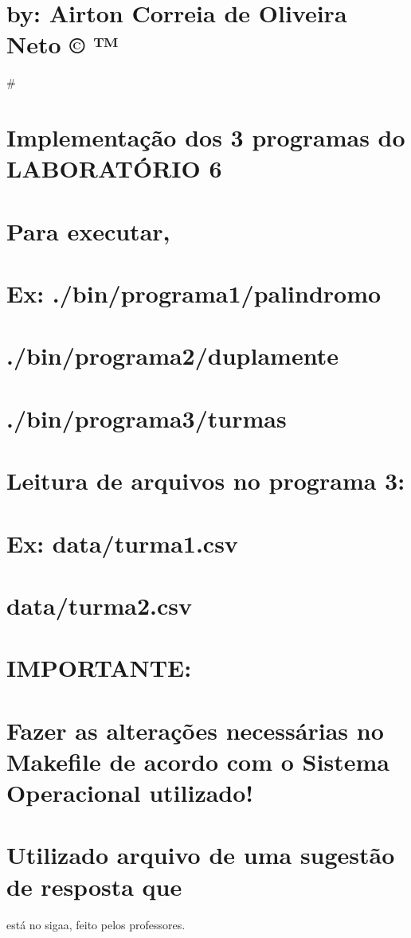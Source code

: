 \section*{by\+: Airton Correia de Oliveira Neto © ™}

\# \section*{Implementação dos 3 programas do L\+A\+B\+O\+R\+A\+TÓ\+R\+IO 6}

\section*{Para executar,}

\section*{Ex\+: ./bin/programa1/palindromo}

\section*{./bin/programa2/duplamente}

\section*{./bin/programa3/turmas}

\section*{Leitura de arquivos no programa 3\+:}

\section*{Ex\+: data/turma1.\+csv}

\section*{data/turma2.\+csv}

\section*{I\+M\+P\+O\+R\+T\+A\+N\+TE\+:}

\section*{Fazer as alterações necessárias no Makefile de acordo com o Sistema Operacional utilizado!}

\section*{Utilizado arquivo de uma sugestão de resposta que}

está no sigaa, feito pelos professores. 